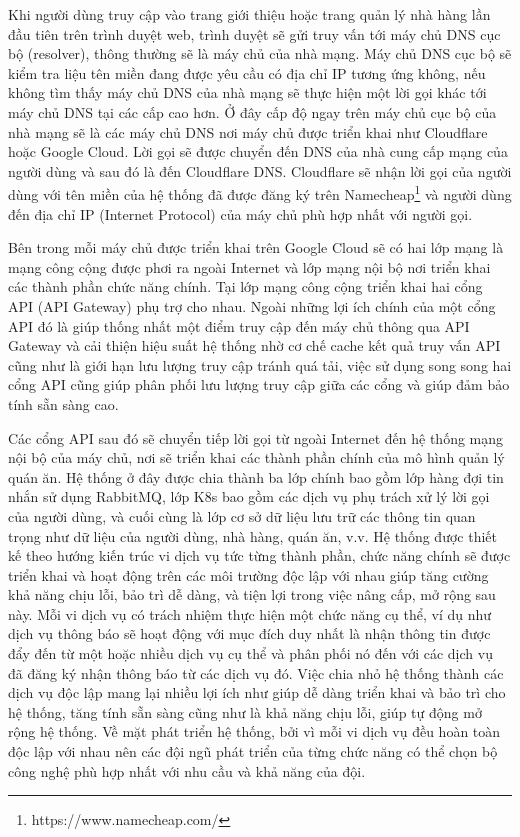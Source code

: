 Khi người dùng truy cập vào trang giới thiệu hoặc trang quản lý nhà hàng lần đầu tiên trên trình duyệt web, trình duyệt sẽ gửi truy vấn tới máy chủ DNS cục bộ (resolver), thông thường sẽ là máy chủ của nhà mạng.
Máy chủ DNS cục bộ sẽ kiểm tra liệu tên miền đang được yêu cầu có địa chỉ IP tương ứng không, nếu không tìm thấy máy chủ DNS của nhà mạng sẽ thực hiện một lời gọi khác tới máy chủ DNS tại các cấp cao hơn.
Ở đây cấp độ ngay trên máy chủ cục bộ của nhà mạng sẽ là các máy chủ DNS nơi máy chủ được triển khai như Cloudflare hoặc Google Cloud.
Lời gọi sẽ được chuyển đến DNS của nhà cung cấp mạng của người dùng và sau đó là đến Cloudflare DNS.
Cloudflare sẽ nhận lời gọi của người dùng với tên miền của hệ thống đã được đăng ký trên Namecheap\footnote{https://www.namecheap.com/} và người dùng đến địa chỉ IP (Internet Protocol) của máy chủ phù hợp nhất với người gọi.

Bên trong mỗi máy chủ được triển khai trên Google Cloud sẽ có hai lớp mạng là mạng công cộng được phơi ra ngoài Internet và lớp mạng nội bộ nơi triển khai các thành phần chức năng chính.
Tại lớp mạng công cộng triển khai hai cổng API (API Gateway) phụ trợ cho nhau.
Ngoài những lợi ích chính của một cổng API đó là giúp thống nhất một điểm truy cập đến máy chủ thông qua API Gateway và cải thiện hiệu suất hệ thống nhờ cơ chế cache kết quả truy vấn API cũng như là giới hạn lưu lượng truy cập tránh quá tải, việc sử dụng song song hai cổng API cũng giúp phân phối lưu lượng truy cập giữa các cổng và giúp đảm bảo tính sẵn sàng cao.

Các cổng API sau đó sẽ chuyển tiếp lời gọi từ ngoài Internet đến hệ thống mạng nội bộ của máy chủ, nơi sẽ triển khai các thành phần chính của mô hình quản lý quán ăn.
Hệ thống ở đây được chia thành ba lớp chính bao gồm lớp hàng đợi tin nhắn sử dụng RabbitMQ, lớp K8s bao gồm các dịch vụ phụ trách xử lý lời gọi của người dùng, và cuối cùng là lớp cơ sở dữ liệu lưu trữ các thông tin quan trọng như dữ liệu của người dùng, nhà hàng, quán ăn, v.v.
Hệ thống được thiết kế theo hướng kiến trúc vi dịch vụ tức từng thành phần, chức năng chính sẽ được triển khai và hoạt động trên các môi trường độc lập với nhau giúp tăng cường khả năng chịu lỗi, bảo trì dễ dàng, và tiện lợi trong việc nâng cấp, mở rộng sau này.
Mỗi vi dịch vụ có trách nhiệm thực hiện một chức năng cụ thể, ví dụ như dịch vụ thông báo sẽ hoạt động với mục đích duy nhất là nhận thông tin được đẩy đến từ một hoặc nhiều dịch vụ cụ thể và phân phối nó đến với các dịch vụ đã đăng ký nhận thông báo từ các dịch vụ đó.
Việc chia nhỏ hệ thống thành các dịch vụ độc lập mang lại nhiều lợi ích như giúp dễ dàng triển khai và bảo trì cho hệ thống, tăng tính sẵn sàng cũng như là khả năng chịu lỗi, giúp tự động mở rộng hệ thống.
Về mặt phát triển hệ thống, bởi vì mỗi vi dịch vụ đều hoàn toàn độc lập với nhau nên các đội ngũ phát triển của từng chức năng có thể chọn bộ công nghệ phù hợp nhất với nhu cầu và khả năng của đội.

